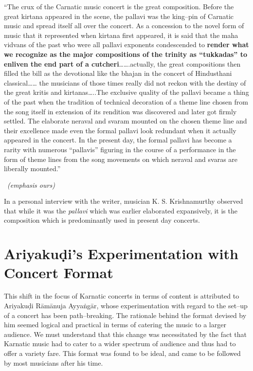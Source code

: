 \begin{myquote}
“The crux of the Carnatic music concert is the great composition. Before the great kirtana appeared in the scene, the pallavi was the king–pin of Carnatic music and spread itself all over the concert. As a concession to the novel form of music that it represented when kirtana first appeared, it is said that the maha vidvans of the past who were all pallavi exponents condescended to \textbf{render what we recognize as the major compositions of the trinity as “tukkadas” to enliven the end part of a cutcheri}…….actually, the great compositions then filled the bill as the devotional like the bhajan in the concert of Hindusthani classical…… the musicians of those times really did not reckon with the destiny of the great kritis and kirtanas…..The exclusive quality of the pallavi became a thing of the past when the tradition of technical decoration of a theme line chosen from the song itself in extension of its rendition was discovered and later got firmly settled. The elaborate neraval and svaram mounted on the chosen theme line and their excellence made even the formal pallavi look redundant when it actually appeared in the concert. In the present day, the formal pallavi has become a rarity with numerous “pallavis” figuring in the course of a performance in the form of theme lines from the song movements on which neraval and svaras are liberally mounted.” 

~\hfill \textit{(emphasis ours)}
\end{myquote}

In a personal interview with the writer, musician K. S. Krishnamurthy observed that while it was the \textit{pallavi} which was earlier elaborated expansively, it is the composition which is predominantly used in present day concerts.


\section*{Ariyakuḍi’s Experimentation with Concert Format}

This shift in the focus of Karnatic concerts in terms of content is attributed to Ariyakuḍi Rāmānuja Ayyaṅgār, whose experimentation with regard to the set–up of a concert has been path–breaking. The rationale behind the format devised by him seemed logical and practical in terms of catering the music to a larger audience. We must understand that this change was necessitated by the fact that Karnatic music had to cater to a wider spectrum of audience and thus had to offer a variety fare. This format was found to be ideal, and came to be followed by most musicians after his time.

